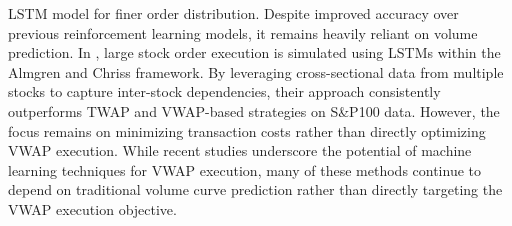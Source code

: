 LSTM model for finer order distribution. Despite improved accuracy over previous reinforcement learning models, it remains heavily reliant on volume prediction. In \cite{papanicolaou2023optimal}, large stock order execution is simulated using LSTMs within the Almgren and Chriss framework. By leveraging cross-sectional data from multiple stocks to capture inter-stock dependencies, their approach consistently outperforms TWAP and VWAP-based strategies on S\&P100 data. However, the focus remains on minimizing transaction costs rather than directly optimizing VWAP execution. While recent studies underscore the potential of machine learning techniques for VWAP execution, many of these methods continue to depend on traditional volume curve prediction rather than directly targeting the VWAP execution objective.